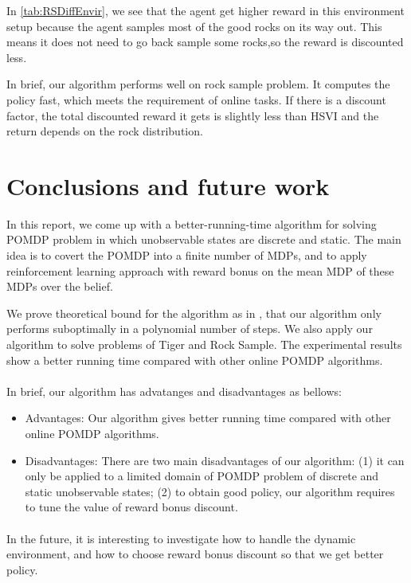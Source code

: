 \documentclass{article}
\begin{document}
In \autoref{tab:RSDiffEnvir}, we see that the agent get higher reward in this environment 
setup because the agent samples most of the good rocks on its way out. This means it does
not need to go back sample some rocks,so the reward is discounted less.

In brief, our algorithm performs well on rock sample problem. It computes the policy fast,
which meets the requirement of online tasks. If there is a discount factor, the total 
discounted reward it gets is slightly less than HSVI and the return depends on the rock 
distribution.


\section{Conclusions and future work}

In this report, we come up with a better-running-time algorithm for solving POMDP problem in which unobservable states are discrete and static. The main idea is 
to covert the POMDP into a finite number of MDPs, and to apply reinforcement learning
approach with reward bonus on the mean MDP of these MDPs over the belief.

We prove theoretical bound for the algorithm as in \cite{kolter}, that our algorithm only
performs suboptimally in a polynomial number of steps. We also apply our algorithm to solve
problems of Tiger and Rock Sample. The experimental results show a better running time 
compared with other online POMDP algorithms.

\paragraph{} In brief, our algorithm has advatanges and disadvantages as bellows:
\begin{itemize}
\item Advantages: Our algorithm gives better running time compared with
other online POMDP algorithms.
\item Disadvantages: There are two main disadvantages of our algorithm: (1)
it can only be applied to a limited domain of POMDP problem of discrete and 
static unobservable states; (2) to obtain good policy, our algorithm requires
to tune the value of reward bonus discount.
\end{itemize}

\paragraph{} In the future, it is interesting to investigate how to handle the dynamic environment, and how to choose reward bonus discount so that we get better policy.
\end{document}
